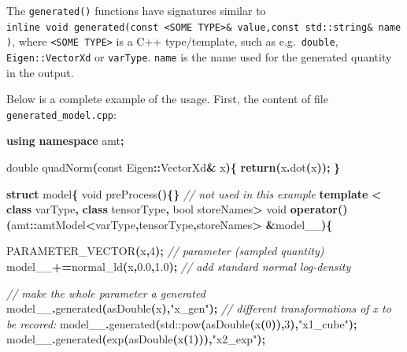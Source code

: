 \documentclass[
]{book}
\newenvironment{Shaded}{\begin{snugshade}}{\end{snugshade}}
\newcommand{\AttributeTok}[1]{\textcolor[rgb]{0.77,0.63,0.00}{#1}}
\newcommand{\BuiltInTok}[1]{#1}
\newcommand{\CommentTok}[1]{\textcolor[rgb]{0.56,0.35,0.01}{\textit{#1}}}
\newcommand{\ControlFlowTok}[1]{\textcolor[rgb]{0.13,0.29,0.53}{\textbf{#1}}}
\newcommand{\DataTypeTok}[1]{\textcolor[rgb]{0.13,0.29,0.53}{#1}}
\newcommand{\DecValTok}[1]{\textcolor[rgb]{0.00,0.00,0.81}{#1}}
\newcommand{\FloatTok}[1]{\textcolor[rgb]{0.00,0.00,0.81}{#1}}
\newcommand{\KeywordTok}[1]{\textcolor[rgb]{0.13,0.29,0.53}{\textbf{#1}}}
\newcommand{\NormalTok}[1]{#1}
\newcommand{\OperatorTok}[1]{\textcolor[rgb]{0.81,0.36,0.00}{\textbf{#1}}}
\newcommand{\StringTok}[1]{\textcolor[rgb]{0.31,0.60,0.02}{#1}}
\begin{document}
The \texttt{generated()} functions have signatures similar to
\texttt{inline\ void\ generated(const\ \textless{}SOME\ TYPE\textgreater{}\&\ value,const\ std::string\&\ name)}, where \texttt{\textless{}SOME\ TYPE\textgreater{}} is a C++ type/template, such as e.g.~\texttt{double}, \texttt{Eigen::VectorXd} or \texttt{varType}. \texttt{name} is the name used for the generated quantity in the output.

Below is a complete example of the usage. First, the content of file \texttt{generated\_model.cpp}:

\begin{Shaded}
\begin{Highlighting}[]
\KeywordTok{using} \KeywordTok{namespace}\NormalTok{ amt}\OperatorTok{;}

\DataTypeTok{double}\NormalTok{ quadNorm}\OperatorTok{(}\AttributeTok{const}\NormalTok{ Eigen}\OperatorTok{::}\NormalTok{VectorXd}\OperatorTok{\&}\NormalTok{ x}\OperatorTok{)\{}
  \ControlFlowTok{return}\OperatorTok{(}\NormalTok{x}\OperatorTok{.}\NormalTok{dot}\OperatorTok{(}\NormalTok{x}\OperatorTok{));}
\OperatorTok{\}}

\KeywordTok{struct}\NormalTok{ model}\OperatorTok{\{}
  \DataTypeTok{void}\NormalTok{ preProcess}\OperatorTok{()\{\}} \CommentTok{// not used in this example }
  \KeywordTok{template} \OperatorTok{\textless{}} \KeywordTok{class}\NormalTok{ varType}\OperatorTok{,} \KeywordTok{class}\NormalTok{ tensorType}\OperatorTok{,} \DataTypeTok{bool}\NormalTok{ storeNames}\OperatorTok{\textgreater{}}
  \DataTypeTok{void} \KeywordTok{operator}\OperatorTok{()(}\NormalTok{amt}\OperatorTok{::}\NormalTok{amtModel}\OperatorTok{\textless{}}\NormalTok{varType}\OperatorTok{,}\NormalTok{tensorType}\OperatorTok{,}\NormalTok{storeNames}\OperatorTok{\textgreater{}} \OperatorTok{\&}\NormalTok{model\_\_}\OperatorTok{)\{}
    
\NormalTok{    PARAMETER\_VECTOR}\OperatorTok{(}\NormalTok{x}\OperatorTok{,}\DecValTok{4}\OperatorTok{);} \CommentTok{// parameter (sampled quantity)}
\NormalTok{    model\_\_}\OperatorTok{+=}\NormalTok{normal\_ld}\OperatorTok{(}\NormalTok{x}\OperatorTok{,}\FloatTok{0.0}\OperatorTok{,}\FloatTok{1.0}\OperatorTok{);} \CommentTok{// add standard normal log{-}density}
    
    
    \CommentTok{// make the whole parameter a generated}
\NormalTok{    model\_\_}\OperatorTok{.}\NormalTok{generated}\OperatorTok{(}\NormalTok{asDouble}\OperatorTok{(}\NormalTok{x}\OperatorTok{),}\StringTok{"x\_gen"}\OperatorTok{);} 
    \CommentTok{// different transformations of x to be recored:}
\NormalTok{    model\_\_}\OperatorTok{.}\NormalTok{generated}\OperatorTok{(}\BuiltInTok{std::}\NormalTok{pow}\OperatorTok{(}\NormalTok{asDouble}\OperatorTok{(}\NormalTok{x}\OperatorTok{(}\DecValTok{0}\OperatorTok{)),}\DecValTok{3}\OperatorTok{),}\StringTok{"x1\_cube"}\OperatorTok{);}
\NormalTok{    model\_\_}\OperatorTok{.}\NormalTok{generated}\OperatorTok{(}\NormalTok{exp}\OperatorTok{(}\NormalTok{asDouble}\OperatorTok{(}\NormalTok{x}\OperatorTok{(}\DecValTok{1}\OperatorTok{))),}\StringTok{"x2\_exp"}\OperatorTok{);}
    

\end{Highlighting}
\end{Shaded}
\end{document}
